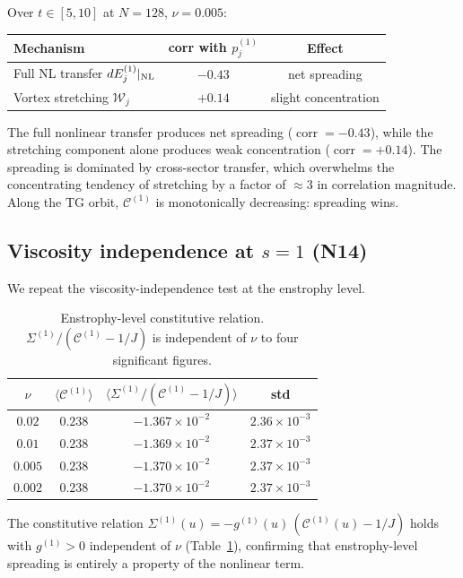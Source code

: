 \documentclass[11pt]{article}
\theoremstyle{definition}
\newcommand{\cC}{\mathcal{C}}
\DeclareMathOperator{\corr}{corr}
\begin{document}
Over $t\in[5,10]$ at $N=128$, $\nu=0.005$:
\begin{center}
\renewcommand{\arraystretch}{1.2}
\begin{tabular}{@{}lcc@{}}
\toprule
\textbf{Mechanism} & \textbf{corr with $p_j^{(1)}$}
  & \textbf{Effect} \\
\midrule
Full NL transfer $dE_j^{(1)}|_{\rm NL}$
  & $-0.43$ & net spreading \\
Vortex stretching $\mathcal{W}_j$
  & $+0.14$ & slight concentration \\
\bottomrule
\end{tabular}
\end{center}

The full nonlinear transfer produces net spreading
($\corr=-0.43$), while the stretching component alone
produces weak concentration ($\corr=+0.14$).  The
spreading is dominated by cross-sector transfer, which
overwhelms the concentrating tendency of stretching by
a factor of $\approx 3$ in correlation magnitude.
Along the TG orbit, $\cC^{(1)}$ is monotonically
decreasing: spreading wins.


\subsection{Viscosity independence at $s=1$ (N14)}
\label{sec:enst-visc}

We repeat the viscosity-independence test at the
enstrophy level.

\begin{table}[h]
\centering
\caption{Enstrophy-level constitutive relation.
$\Sigma^{(1)}/(\cC^{(1)}-1/J)$ is independent of
$\nu$ to four significant figures.}
\label{tab:enst-visc}
\begin{tabular}{@{}cccc@{}}
\toprule
$\nu$ & $\langle\cC^{(1)}\rangle$
  & $\langle\Sigma^{(1)}/(\cC^{(1)}\!-\!1/J)\rangle$
  & std \\
\midrule
$0.02$  & $0.238$ & $-1.367\times 10^{-2}$
  & $2.36\times 10^{-3}$ \\
$0.01$  & $0.238$ & $-1.369\times 10^{-2}$
  & $2.37\times 10^{-3}$ \\
$0.005$ & $0.238$ & $-1.370\times 10^{-2}$
  & $2.37\times 10^{-3}$ \\
$0.002$ & $0.238$ & $-1.370\times 10^{-2}$
  & $2.37\times 10^{-3}$ \\
\bottomrule
\end{tabular}
\end{table}

The constitutive relation
$\Sigma^{(1)}(u) = -g^{(1)}(u)\,(\cC^{(1)}(u)-1/J)$
holds with $g^{(1)}>0$ independent of $\nu$
(Table~\ref{tab:enst-visc}), confirming that
enstrophy-level spreading is entirely a property of
the nonlinear term.
\end{document}
